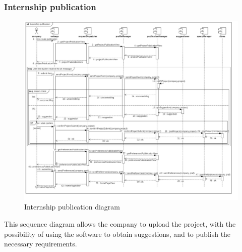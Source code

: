 \documentclass{article}
\begin{document}
\subsubsection{Internship publication}

\begin{figure}[H]
    \centering
    \includegraphics[width=1\linewidth]{SequenceDiagram/Internship publication.jpg}
    \caption{Internship publication diagram}
    \label{fig:enter-label}
\end{figure}
This sequence diagram allows the company to upload the project, with the possibility of using the software to obtain suggestions, and to publish the necessary requirements.
\end{document}
